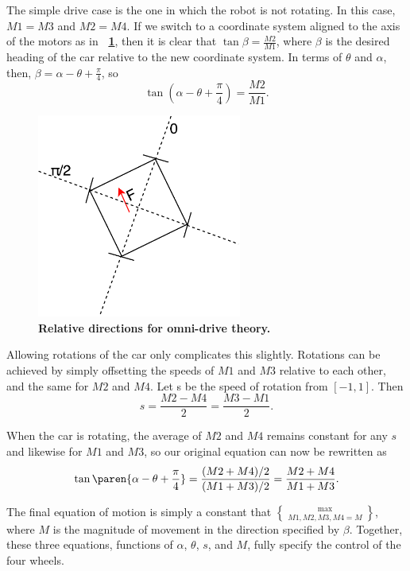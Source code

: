 \documentclass[letterpaper, 11pt]{article}
\newcommand*{\figref}[1]{\textbf{\figurename~\ref{#1}}}
\begin{document}
\begin{enumerate}[label=\textbf{\arabic*.}]
The simple drive case is the one in which the robot is not rotating. In this case, $M1=M3$ and $M2=M4$. If we switch to a coordinate system aligned to the axis of the motors as in \figref{fig:omni2}, then it is clear that $\tan{\beta} = \frac{M2}{M1}$, where $\beta$ is the desired heading of the car relative to the new coordinate system. In terms of $\theta$ and $\alpha$, then, $\beta = \alpha - \theta + \frac{\pi}{4}$, so \[\tan{(\alpha - \theta + \frac{\pi}{4})} = \frac{M2}{M1}.\]

\begin{figure}[ht]
    \centering
    \includegraphics[width=0.6\textwidth]{images/omni2.pdf}
    \caption{\textbf{Relative directions for omni-drive theory.}}
    \label{fig:omni2}
\end{figure}

Allowing rotations of the car only complicates this slightly. Rotations can be achieved by simply offsetting the speeds of $M1$ and $M3$ relative to each other, and the same for $M2$ and $M4$. Let s be the speed of rotation from $[-1, 1]$. Then \[s = \frac{M2-M4}{2} = \frac{M3-M1}{2}.\]

When the car is rotating, the average of $M2$ and $M4$ remains constant for any $s$ and likewise for $M1$ and $M3$, so our original equation can now be rewritten as \[\tan\paren{\alpha - \theta + \frac{\pi}{4}} = \frac{(M2+M4)/2}{(M1+M3)/2} = \frac{M2+M4}{M1+M3}.\]

The final equation of motion is simply a constant that $\max\brace{M1, M2, M3, M4} = M$, where $M$ is the magnitude of movement in the direction specified by $\beta$. Together, these three equations, functions of $\alpha$, $\theta$, $s$, and $M$, fully specify the control of the four wheels.


\end{enumerate}
\end{document}
